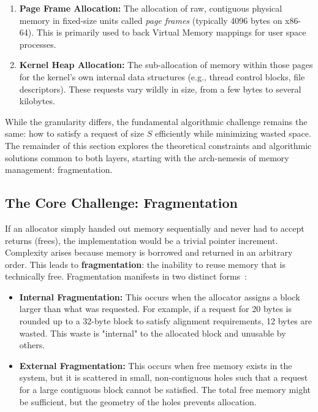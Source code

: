 \documentclass[a4paper,10pt,twoside]{report}
\theoremstyle{definition}
\begin{document}
\begin{enumerate}
\item \textbf{Page Frame Allocation:} The allocation of raw, contiguous physical memory in fixed-size units called \textit{page frames} (typically 4096 bytes on x86-64). This is primarily used to back Virtual Memory mappings for user space processes.
\item \textbf{Kernel Heap Allocation:} The sub-allocation of memory within those pages for the kernel's own internal data structures (e.g., thread control blocks, file descriptors). These requests vary wildly in size, from a few bytes to several kilobytes.
\end{enumerate}

While the granularity differs, the fundamental algorithmic challenge remains the same: how to satisfy a request of size $S$ efficiently while minimizing wasted space. The remainder of this section explores the theoretical constraints and algorithmic solutions common to both layers, starting with the arch-nemesis of memory management: fragmentation.

\subsection{The Core Challenge: Fragmentation}

If an allocator simply handed out memory sequentially and never had to accept returns (frees), the implementation would be a trivial pointer increment. Complexity arises because memory is borrowed and returned in an arbitrary order. This leads to \textbf{fragmentation}: the inability to reuse memory that is technically free. Fragmentation manifests in two distinct forms~\cite{wilson1995survey}:

\begin{itemize}
    \item \textbf{Internal Fragmentation:} This occurs when the allocator assigns a block larger than what was requested. For example, if a request for 20 bytes is rounded up to a 32-byte block to satisfy alignment requirements, 12 bytes are wasted. This waste is "internal" to the allocated block and unusable by others.
    \item \textbf{External Fragmentation:} This occurs when free memory exists in the system, but it is scattered in small, non-contiguous holes such that a request for a large contiguous block cannot be satisfied. The total free memory might be sufficient, but the geometry of the holes prevents allocation.
\end{itemize}
\end{document}
